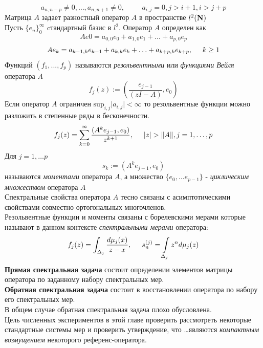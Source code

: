 \documentclass{report}
\begin{document}
$$a_{n,n-p}\not=0,\ldots,a_{n,n+1}\not=0, \hspace{1cm} a_{i,j}=0, j>i+1,i>j+p $$
Матрица $A$ задает разностный оператор $A$ в пространстве $l^2 (\sf \textbf {N} )$ \\
Пусть $\{ e_n \}_{0}^{\infty}$ cтандартный базис в $l^2$.   
Оператор $A$ определен как
$$
Ae0=a_{0,0}e_0+ a_{1,0}e_1 + \ldots + a_{p,0}e_p
$$
$$
Ae_k=a_{k-1,k}e_{k-1}+a_{k,k}e_{k}+\ldots+a_{k+p,k}e_{k+p}, \hspace {0.5cm} k\geq 1
$$
Функций $(f_1, ... , f_p)$ называются \emph {резольвентными}  или \emph {функциями Вейля}  оператора $A$ 
$$
f_j(z) := \left(\frac {e_{j-1}} {(zI - A)}, e_0 \right)
$$
Если оператор $A$ ограничен $\mbox{sup}_{i,j} \vert a_{i,j} \vert < \infty $ то резольвентные функции можно разложить в степенные ряды в бесконечности.
$$
f_j(z) = \sum\limits_{k=0}^{\infty}{\frac{(A^k e_{j-1}, e_0)}{z^{k+1}}}, \hspace{0.5cm} \vert z \vert > \Vert A \Vert, j=1,\ldots,p
$$
Для $j=1,\ldots p$ 
$$
s_k :=(A^k e_{j-1}, e_0)
$$ 
называются \emph {моментами}  оператора $A$, а множество $\{e_0, \ldots e_{p-1}\}$ - \emph {циклическим множеством} оператора $A$ \\
Спектральные свойства оператора $A$ тесно связаны с асимптотическими свойствами совместно ортогональных многочленов. \\
Резольвентные функции и моменты связаны с борелевскими мерами которые называют в данном контексте \emph {спектральными мерами}  оператора:
$$
f_j(z) = \int _{\Delta_j} \frac{d\mu_j(x)}{z-x}, \hspace{0.5cm} s_n^{(j)}=\int \limits_{\Delta_j} {z^n d\mu_j (z)}
$$
\textbf {Прямая спектральная задача} состоит определении элементов матрицы оператора по заданному набору спектральных мер. \\
\textbf {Обратная спектральная задача} состоит в восстановлении оператора по набору его спектральных мер. \\
В общем случае обратная спектральная задача плохо обусловлена. \\
Цель численных экспериментов в этой главе проверить рассмотреть некоторые стандартные системы мер и проверить утверждение, что \ldots являются \textit {компактным возмущением}  некоторого референс-оператора.

\newpage 
\end{document}

